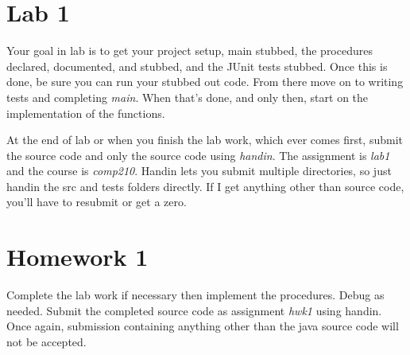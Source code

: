 \documentclass[nobib]{tufte-handout}
\begin{document}
\section{Lab 1}

Your goal in lab is to get your project setup, main stubbed, the procedures declared, documented, and stubbed, and the JUnit tests stubbed. Once this is done, be sure you can run your stubbed out code. From there move on to writing tests and completing \textit{main}.  When that's done, and only then, start on the implementation of the functions.

At the end of lab or when you finish the lab work, which ever comes first, submit the source code and only the source code using \textit{handin}. The assignment is \textit{lab1} and the course is \textit{comp210}. Handin lets you submit multiple directories, so just handin the src and tests folders directly. If I get anything other than source code, you'll have to resubmit or get a zero.

\section{Homework 1}

Complete the lab work if necessary then implement the procedures. Debug as needed. Submit the completed source code as assignment \textit{hwk1} using handin. Once again, submission containing anything other than the java source code will not be accepted.
\end{document}
